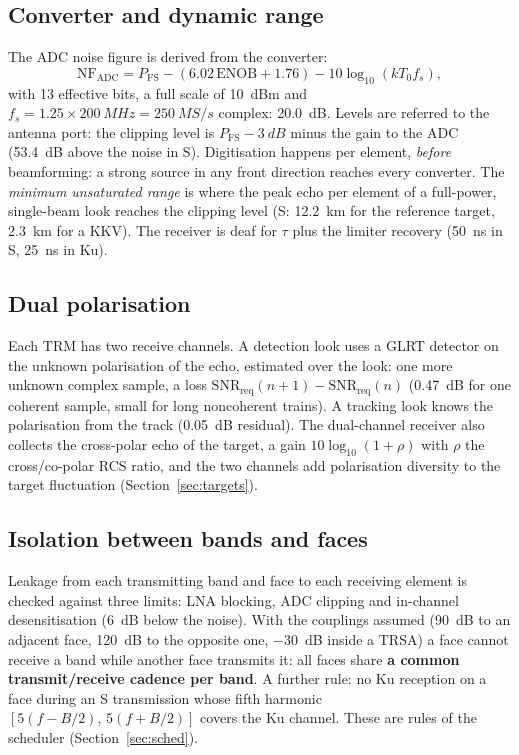 \documentclass[11pt,a4paper]{article}
\newcommand{\SNR}{\mathrm{SNR}}
\begin{document}
\subsection{Converter and dynamic range}
The ADC noise figure is derived from the converter:
\[
  \mathrm{NF}_{\mathrm{ADC}} = P_{\mathrm{FS}} - (6.02\,\mathrm{ENOB} + 1.76) - 10\log_{10}(k T_0 f_s),
\]
with 13 effective bits, a full scale of \SI{+10}{dBm} and $f_s = 1.25\times\SI{200}{MHz} = \SI{250}{MS/s}$
complex: \SI{20.0}{dB}. Levels are referred to the antenna port: the clipping level is $P_{\mathrm{FS}} - \SI{3}{dB}$
minus the gain to the ADC (\SI{53.4}{dB} above the noise in S). Digitisation happens per element, \emph{before}
beamforming: a strong source in any front direction reaches every converter. The \emph{minimum unsaturated range} is
where the peak echo per element of a full-power, single-beam look reaches the clipping level (S: \SI{12.2}{km} for
the reference target, \SI{2.3}{km} for a KKV). The receiver is deaf for $\tau$ plus the limiter recovery
(\SI{50}{ns} in S, \SI{25}{ns} in Ku).

\subsection{Dual polarisation}
Each TRM has two receive channels. A detection look uses a GLRT detector on the unknown polarisation of the echo,
estimated over the look: one more unknown complex sample, a loss $\SNR_{\mathrm{req}}(n+1)-\SNR_{\mathrm{req}}(n)$
(\SI{0.47}{dB} for one coherent sample, small for long noncoherent trains). A tracking look knows the polarisation
from the track (\SI{0.05}{dB} residual). The dual-channel receiver also collects the cross-polar echo of the target,
a gain $10\log_{10}(1+\rho)$ with $\rho$ the cross/co-polar RCS ratio, and the two channels add polarisation diversity
to the target fluctuation (Section~\ref{sec:targets}).

\subsection{Isolation between bands and faces}
Leakage from each transmitting band and face to each receiving element is checked against three limits: LNA blocking,
ADC clipping and in-channel desensitisation (\SI{6}{dB} below the noise). With the couplings assumed (\SI{90}{dB} to
an adjacent face, \SI{120}{dB} to the opposite one, \SI{-30}{dB} inside a TRSA) a face cannot receive a band while
another face transmits it: all faces share \textbf{a common transmit/receive cadence per band}. A further rule: no Ku
reception on a face during an S transmission whose fifth harmonic $[5(f-B/2),\,5(f+B/2)]$ covers the Ku channel. These
are rules of the scheduler (Section~\ref{sec:sched}).
\end{document}
